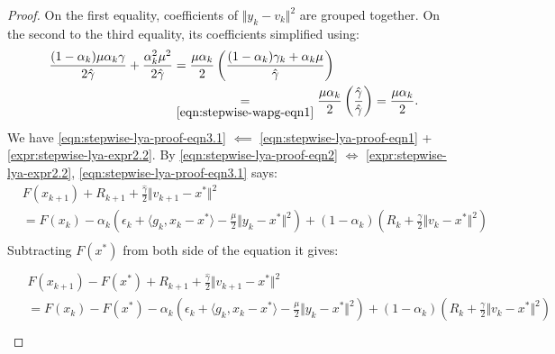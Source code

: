 \documentclass[12pt]{article}
\begin{document}
\begin{proof}
        On the first equality, coefficients of $\Vert y_k - v_k\Vert^2$ are grouped together. 
        On the second to the third equality, its coefficients simplified using: 
        \begin{align*}
            \frac{(1 - \alpha_k)\mu\alpha_k\gamma}{2\hat \gamma} + 
            \frac{\alpha_k^2 \mu^2}{2\hat \gamma}
            &= 
            \frac{\mu\alpha_k}{2}\left(
                \frac{(1 - \alpha_k)\gamma_k + \alpha_k \mu}{\hat \gamma}
            \right)
            \\
            &\underset{\eqref{eqn:stepwise-wapg-eqn1}}{=} \frac{\mu\alpha_k}{2}\left(
                \frac{\hat \gamma}{\hat \gamma}
            \right) = \frac{\mu\alpha_k}{2}. 
        \end{align*}
        We have \eqref{eqn:stepwise-lya-proof-eqn3.1} $\impliedby$ \eqref{eqn:stepwise-lya-proof-eqn1} + \eqref{expr:stepwise-lya-expr2.2}. 
        By \eqref{eqn:stepwise-lya-proof-eqn2} $\iff$ \eqref{expr:stepwise-lya-expr2.2},
        \eqref{eqn:stepwise-lya-proof-eqn3.1} says: 
        \begin{align*}
            & F(x_{k + 1}) + R_{k + 1} + 
            \frac{\hat \gamma}{2}\Vert v_{k + 1} - x^*\Vert^2
            \\
            &= 
            F(x_k) - \alpha_k\left(
                \epsilon_k + \langle g_k, x_k - x^*\rangle
                - \frac{\mu}{2}\Vert y_k - x^*\Vert^2
            \right)
            + 
            (1 - \alpha_k)\left(
                R_k + \frac{\gamma}{2}\Vert v_k - x^*\Vert^2
            \right)
            \\
        \end{align*}
        Subtracting $F(x^*)$ from both side of the equation it gives: 
        \begin{align}\label{eqn:stepwise-lya-proof-eqn3.2}
            \begin{split}
                \\
                & F(x_{k + 1}) - F(x^*) + R_{k + 1} + 
                \frac{\hat \gamma}{2}\Vert v_{k + 1} - x^*\Vert^2
                \\
                &= 
                F(x_k) - F(x^*) - \alpha_k\left(
                    \epsilon_k + \langle g_k, x_k - x^*\rangle
                    - \frac{\mu}{2}\Vert y_k - x^*\Vert^2
                \right)
                + 
                (1 - \alpha_k)\left(
                    R_k + \frac{\gamma}{2}\Vert v_k - x^*\Vert^2
                \right)
                \\

\end{split}
\end{align}
\end{proof}
\end{document}
